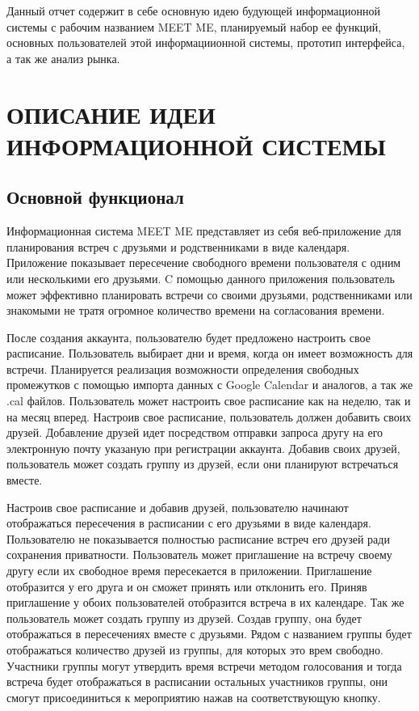 \documentclass[14pt]{extreport}
\begin{document}
\pagestyle{empty} %



\pagestyle{plain} %
\tableofcontents
\intro\label{intro}

Данный отчет содержит в себе основную идею будующей информационной системы с рабочим названием MEET ME, планируемый набор ее функций, основных пользователей этой информациионной системы, прототип интерфейса, а так же анализ рынка.

\chapter{ОПИСАНИЕ ИДЕИ ИНФОРМАЦИОННОЙ СИСТЕМЫ \label{chapter1}}

\section{Основной функционал }

Информационная система MEET ME представляет из себя веб-приложение для планирования встреч с друзьями и родственниками в виде календаря. 
Приложение показывает пересечение свободного времени пользователя с одним или несколькими его друзьями.
C помощью данного приложения пользователь может эффективно планировать встречи со своими друзьями, родственниками или знакомыми не тратя огромное количество времени на согласования времени. 

После создания аккаунта, пользователю будет предложено настроить свое расписание. Пользователь выбирает дни и время, когда он имеет возможность для встречи. Планируется реализация возможности определения свободных промежутков с помощью импорта данных с Google Calendar и аналогов, а так же .cal файлов.
Пользователь может настроить свое расписание как на неделю, так и на месяц вперед. Настроив свое расписание, пользователь должен добавить своих друзей.  Добавление друзей идет посредством отправки запроса другу на его электронную почту указаную при регистрации аккаунта. Добавив своих друзей, пользователь может создать группу из друзей, если они планируют встречаться вместе.

Настроив свое расписание и добавив друзей, пользователю начинают отображаться пересечения в расписании с его друзьями в виде календаря. Пользователю не показывается полностью расписание встреч его друзей ради сохранения приватности. Пользователь может приглашение на встречу своему другу если их свободное время пересекается в приложении. Приглашение отобразится у его друга и он сможет принять или отклонить его. Приняв приглашение у обоих пользователей отобразится встреча в их календаре. Так же пользователь может создать группу из друзей. Создав группу, она будет отображаться в пересечениях вместе с друзьями. Рядом с названием группы будет отображаться количество друзей из группы, для которых это врем свободно. Участники группы могут утвердить время встречи методом голосования и тогда встреча будет отображаться в расписании остальных участников группы, они смогут присоединиться к мероприятию нажав на соответствующую кнопку.
\end{document}
